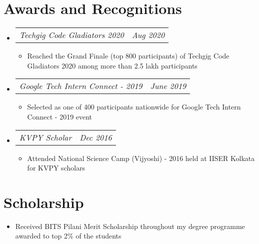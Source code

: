 \documentclass[res,10pt]{article}
\makeatletter
\newcommand{\resumeItem}[1]{
  \item\small{
    {#1 \vspace{-2pt}}
  }
}
\newcommand{\resumeSubSubheading}[2]{
    \item
    \begin{tabular*}{0.97\textwidth}{l@{\extracolsep{\fill}}r}
      \textit{\small#1} & \textit{\small #2} \\
    \end{tabular*}\vspace{-7pt}
}
\newcommand{\resumeSubHeadingListStart}{\begin{itemize}[leftmargin=0.15in, label={}]}
\newcommand{\resumeSubHeadingListEnd}{\end{itemize}}
\newcommand{\resumeItemListStart}{\begin{itemize}}
\newcommand{\resumeItemListEnd}{\end{itemize}\vspace{-5pt}}
\makeatother
\begin{document}
\section{Awards and Recognitions}
 \resumeSubHeadingListStart

    \resumeSubSubheading
      {Techgig Code Gladiators 2020}{Aug 2020}
      \resumeItemListStart
        \resumeItem{Reached the Grand Finale (top 800 participants) of Techgig Code Gladiators 2020 among more than 2.5 lakh participants}
      \resumeItemListEnd

    \resumeSubSubheading
      {Google Tech Intern Connect - 2019}{June 2019}
      \resumeItemListStart
        \resumeItem{Selected as one of 400 participants nationwide for Google Tech Intern Connect - 2019 event}
      \resumeItemListEnd
    
    \resumeSubSubheading
      {KVPY Scholar}{Dec 2016}
      \resumeItemListStart
        \resumeItem{Attended National Science Camp (Vijyoshi) - 2016 held at IISER Kolkata for KVPY scholars}
      \resumeItemListEnd
    
  \resumeSubHeadingListEnd

\section{Scholarship}
    \resumeItemListStart
    \resumeItem{Received BITS Pilani Merit Scholarship throughout my degree programme awarded to top 2\% of the students}
    \resumeItemListEnd
\end{document}
